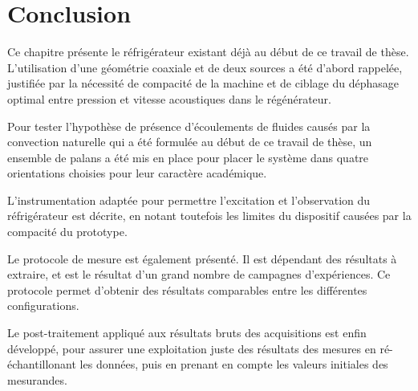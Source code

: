 \section{Conclusion}
Ce chapitre présente le réfrigérateur existant déjà au début de ce travail de thèse. L'utilisation d'une géométrie coaxiale et de deux sources a été d'abord rappelée, justifiée par la nécessité de compacité de la machine et de ciblage du déphasage optimal entre pression et vitesse acoustiques dans le régénérateur.\smallskip

Pour tester l'hypothèse de présence d'écoulements de fluides causés par la convection naturelle qui a été formulée au début de ce travail de thèse, un ensemble de palans a été mis en place pour placer le système dans quatre orientations choisies pour leur caractère académique.

L'instrumentation adaptée pour permettre l'excitation et l'observation du réfrigérateur est décrite, en notant toutefois les limites du dispositif causées par la compacité du prototype.

Le protocole de mesure est également présenté. Il est dépendant des résultats à extraire, et est le résultat d'un grand nombre de campagnes d'expériences. Ce protocole permet d'obtenir des résultats comparables entre les différentes configurations.

Le post-traitement appliqué aux résultats bruts des acquisitions est enfin développé, pour assurer une exploitation juste des résultats des mesures en ré-échantillonant les données, puis en prenant en compte les valeurs initiales des mesurandes.

\begin{center}
{

}
\end{center}






